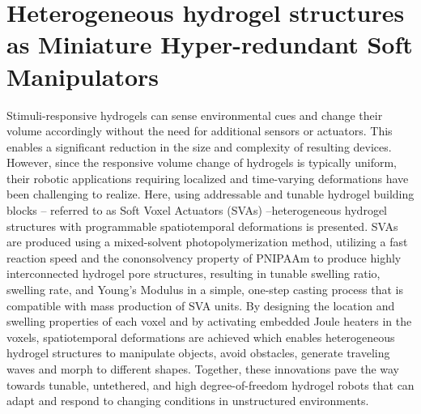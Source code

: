 \graphicspath{{Images/heterogeneous/}}

\chapter{Heterogeneous hydrogel structures as Miniature Hyper-redundant Soft Manipulators}
\label{chap:heterogeneous}
Stimuli-responsive hydrogels can sense environmental cues and change their volume accordingly without the need for additional sensors or actuators. This enables a significant reduction in the size and complexity of resulting devices. However, since the responsive volume change of hydrogels is typically uniform, their robotic applications requiring localized and time-varying deformations have been challenging to realize. Here, using addressable and tunable hydrogel building blocks – referred to as Soft Voxel Actuators (SVAs) –heterogeneous hydrogel structures with programmable spatiotemporal deformations is presented. SVAs are produced using a mixed-solvent photopolymerization method, utilizing a fast reaction speed and the cononsolvency property of PNIPAAm to produce highly interconnected hydrogel pore structures, resulting in tunable swelling ratio, swelling rate, and Young’s Modulus in a simple, one-step casting process that is compatible with mass production of SVA units. By designing the location and swelling properties of each voxel and by activating embedded Joule heaters in the voxels, spatiotemporal deformations are achieved which enables heterogeneous hydrogel structures to manipulate objects, avoid obstacles, generate traveling waves and morph to different shapes. Together, these innovations pave the way towards tunable, untethered, and high degree-of-freedom hydrogel robots that can adapt and respond to changing conditions in unstructured environments.
